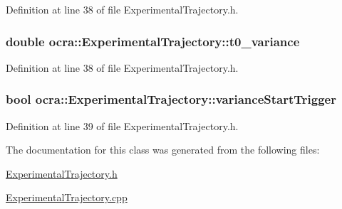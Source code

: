 Definition at line 38 of file Experimental\+Trajectory.\+h.

\subsubsection[{\texorpdfstring{t0\+\_\+variance}{t0_variance}}]{\setlength{\rightskip}{0pt plus 5cm}double ocra\+::\+Experimental\+Trajectory\+::t0\+\_\+variance\hspace{0.3cm}{\ttfamily [protected]}}\hypertarget{classocra_1_1ExperimentalTrajectory_a90502f229cbccfd19bd884d7b87f734d}{}\label{classocra_1_1ExperimentalTrajectory_a90502f229cbccfd19bd884d7b87f734d}


Definition at line 38 of file Experimental\+Trajectory.\+h.

\subsubsection[{\texorpdfstring{variance\+Start\+Trigger}{varianceStartTrigger}}]{\setlength{\rightskip}{0pt plus 5cm}bool ocra\+::\+Experimental\+Trajectory\+::variance\+Start\+Trigger\hspace{0.3cm}{\ttfamily [protected]}}\hypertarget{classocra_1_1ExperimentalTrajectory_ab10b037615b07e20b0d6f81c48b7fd23}{}\label{classocra_1_1ExperimentalTrajectory_ab10b037615b07e20b0d6f81c48b7fd23}


Definition at line 39 of file Experimental\+Trajectory.\+h.



The documentation for this class was generated from the following files\+:\begin{DoxyCompactItemize}
\item 
\hyperlink{ExperimentalTrajectory_8h}{Experimental\+Trajectory.\+h}\item 
\hyperlink{ExperimentalTrajectory_8cpp}{Experimental\+Trajectory.\+cpp}\end{DoxyCompactItemize}

